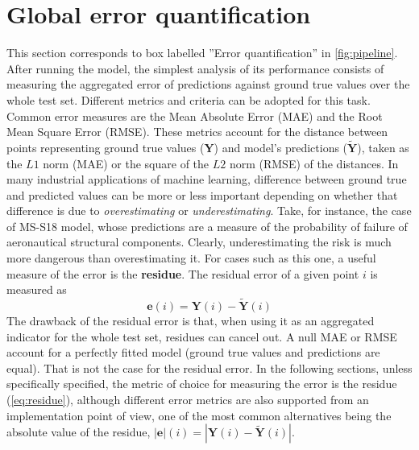 \section{Global error quantification}
\noindent This section corresponds to box labelled ''Error quantification'' in \autoref{fig:pipeline}.\\
%
\indent After running the model, the simplest analysis of its performance consists of measuring the aggregated error of predictions against ground true values over the whole test set. Different metrics and criteria can be adopted for this task. Common error measures are the Mean Absolute Error (MAE) and the Root Mean Square Error (RMSE). These metrics account for the distance between points representing ground true values ($\mathbf{Y}$) and model's predictions ($\mathbf{\tilde{Y}}$), taken as the $L1$ norm (MAE) or the square of the $L2$ norm (RMSE) of the distances. In many industrial applications of machine learning, difference between ground true and predicted values can be more or less important depending on whether that difference is due to \textit{overestimating} or \textit{underestimating}. Take, for instance, the case of MS-S18 model, whose predictions are a measure of the probability of failure of aeronautical structural components. Clearly, underestimating the risk is much more dangerous than overestimating it. For cases such as this one, a useful measure of the error is the \textbf{residue}. The residual error of a given point $i$ is measured as
\begin{equation}\label{eq:residue}
	\mathbf{e}(i)=\mathbf{Y}(i)-\mathbf{\tilde{Y}}(i)
\end{equation}
The drawback of the residual error is that, when using it as an aggregated indicator for the whole test set, residues can cancel out. A null MAE or RMSE account for a perfectly fitted model (ground true values and predictions are equal). That is not the case for the residual error. In the following sections, unless specifically specified, the metric of choice for measuring the error is the residue (\autoref{eq:residue}), although different error metrics are also supported from an implementation point of view, one of the most common alternatives being the absolute value of the residue, $|\mathbf{e}|(i)=|\mathbf{Y}(i)-\mathbf{\tilde{Y}}(i)|$.\\
%
